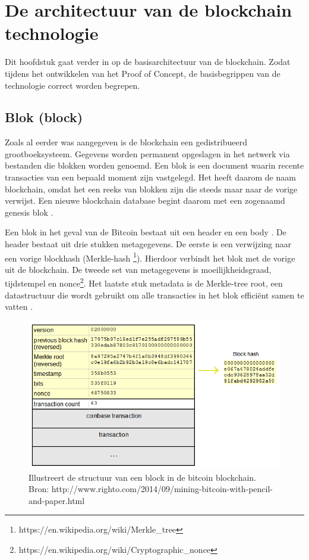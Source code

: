 \chapter{De architectuur van de blockchain technologie}
Dit hoofdstuk gaat verder in op de basisarchitectuur van de blockchain. Zodat tijdens het ontwikkelen van het Proof of Concept, de basisbegrippen van de technologie correct worden begrepen.

\section{Blok (block)}
Zoals al eerder was aangegeven is de blockchain een gedistribueerd grootboeksysteem. Gegevens worden permanent opgeslagen in het netwerk via bestanden die blokken worden genoemd. Een blok is een document waarin recente transacties van een bepaald moment zijn vastgelegd. Het heeft daarom de naam blockchain, omdat het een reeks van blokken zijn die steeds maar naar de vorige verwijst. Een nieuwe blockchain database begint daarom met een zogenaamd genesis blok \cite{blochchainTechSymmbioticDev}.\par
					
Een blok in het geval van de Bitcoin bestaat uit een header en een body \cite{blockchainIssuesAndChallenges}. De header bestaat uit drie stukken metagegevens. De eerste is een verwijzing naar een vorige blockhash (Merkle-hash \footnote{https://en.wikipedia.org/wiki/Merkle\_tree}). Hierdoor verbindt het blok met de vorige uit de blockchain. De tweede set van metagegevens is moeilijkheidsgraad, tijdstempel en nonce\footnote{https://en.wikipedia.org/wiki/Cryptographic\_nonce}. Het laatste stuk metadata is de Merkle-tree root, een datastructuur die wordt gebruikt om alle transacties in het blok efficiënt samen te vatten \cite{masteringBitcoin}.

\begin{figure}[h]
    \begin{center}
        \includegraphics[width=\paperwidth-335pt]{images/block}
        \caption{Illustreert de structuur van een block in de bitcoin blockchain.\\Bron: http://www.righto.com/2014/09/mining-bitcoin-with-pencil-and-paper.html}
        \label{fig:blockchain?}
    \end{center}
\end{figure}
\newpage


